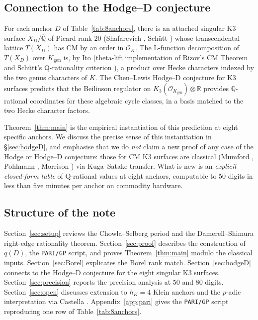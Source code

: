 \documentclass[11pt,a4paper]{amsart}
\theoremstyle{plain}
\theoremstyle{definition}
\newcommand{\Q}{\mathbb{Q}}
\newcommand{\R}{\mathbb{R}}
\newcommand{\OK}{\mathcal{O}_K}
\newcommand{\Kgen}{K_{\mathrm{gen}}}
\begin{document}
\subsection{Connection to the Hodge--D conjecture}

For each anchor $D$ of Table~\ref{tab:8anchors}, there is an attached
singular K3 surface $X_D / \overline{\Q}$ of Picard rank $20$
(Shafarevich \cite{Shafarevich1980}, Schütt \cite{Schutt2008}) whose
transcendental lattice $T(X_D)$ has CM by an order in $\OK$. The
L-function decomposition of $T(X_D)$ over $\Kgen$ is, by Ito
\cite{Ito2024} (theta-lift implementation of
Rizov's CM Theorem \cite{Rizov2010} and Schütt's
Q-rationality criterion \cite{Schutt2008}), a product over
Hecke characters indexed by the two genus characters of $K$.
The Chen--Lewis Hodge--D conjecture for K3 surfaces \cite{ChenLewis2007}
predicts that the Beilinson regulator on
$K_3(\mathcal{O}_\Kgen) \otimes \R$ provides $\Q$-rational coordinates
for these algebraic cycle classes, in a basis matched to the two
Hecke character factors.

Theorem~\ref{thm:main} is the empirical instantiation of this prediction
at eight specific anchors. We discuss the precise sense of this
instantiation in \S\ref{sec:hodgeD}, and emphasise that we do
\emph{not} claim a new proof of any case of the Hodge or Hodge--D
conjecture: those for CM K3 surfaces are classical
(Mumford \cite{Mumford1969}, Pohlmann \cite{Pohlmann1968},
Morrison \cite{Morrison1985}) via Kuga--Satake transfer.
What is new is an \emph{explicit closed-form table} of
Q-rational values at eight anchors, computable to 50 digits in less
than five minutes per anchor on commodity hardware.

\subsection{Structure of the note}

Section~\ref{sec:setup} reviews the Chowla--Selberg period and the
Damerell--Shimura right-edge rationality theorem.
Section~\ref{sec:proof} describes the construction of $q(D)$, the
\texttt{PARI/GP} script, and proves Theorem~\ref{thm:main} modulo the
classical inputs. Section~\ref{sec:Borel} explicates the Borel rank
match. Section~\ref{sec:hodgeD} connects to the Hodge--D conjecture for
the eight singular K3 surfaces. Section~\ref{sec:precision} reports the
precision analysis at $50$ and $80$ digits. Section~\ref{sec:open}
discusses extension to $h_K = 4$ Klein anchors and the $p$-adic
interpretation via Castella \cite{Castella2024}. Appendix~\ref{app:pari}
gives the \texttt{PARI/GP} script reproducing one row of
Table~\ref{tab:8anchors}.
\end{document}
